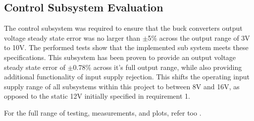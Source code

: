 \subsection{Control Subsystem Evaluation}

The control subsystem was required to ensure that the buck converters output voltage steady state error was no larger than $\pm$5\% across the output range of 3V to 10V. The performed tests show that the implemented sub system meets these specifications. This subsystem has been proven to provide an output voltage steady state error of $\pm$0.78\% across it's full output range, while also providing additional functionality of input supply rejection. This shifts the operating input supply range of all subsystems within this project to between 8V and 16V, as opposed to the static 12V initially specified in requirement 1. 

For the full range of testing, measurements, and plots, refer too .
